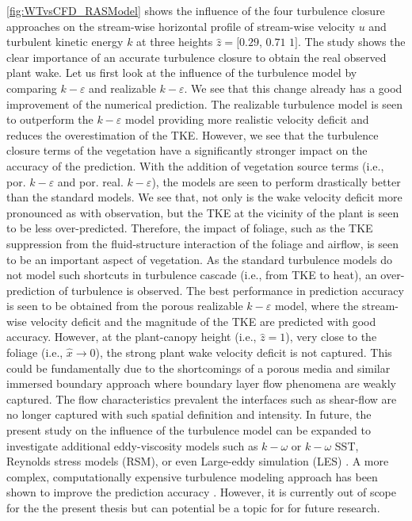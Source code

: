 \cref{fig:WTvsCFD_RASModel} shows the influence of the four turbulence closure approaches on the stream-wise horizontal profile of stream-wise velocity $u$ and turbulent kinetic energy $k$ at three heights $\hat{z} = [0.29$, $0.71$ $1]$. The study shows the clear importance of an accurate turbulence closure to obtain the real observed plant wake. Let us first look at the influence of the turbulence model by comparing $k-\varepsilon$ and realizable $k-\varepsilon$. We see that this change already has a good improvement of the numerical prediction. The realizable turbulence model is seen to outperform the $k-\varepsilon$ model providing more realistic velocity deficit and reduces the overestimation of the TKE. However, we see that the turbulence closure terms of the vegetation have a significantly stronger impact on the accuracy of the prediction. With the addition of vegetation source terms (i.e., por. $k-\varepsilon$ and por. real. $k-\varepsilon$), the models are seen to perform drastically better than the standard models. We see that, not only is the wake velocity deficit more pronounced as with observation, but the TKE at the vicinity of the plant is seen to be less over-predicted. Therefore, the impact of foliage, such as the TKE suppression from the fluid-structure interaction of the foliage and airflow, is seen to be an important aspect of vegetation. As the standard turbulence models do not model such shortcuts in turbulence cascade (i.e., from TKE to heat), an over-prediction of turbulence is observed. The best performance in prediction accuracy is seen to be obtained from the porous realizable $k-\varepsilon$ model, where the stream-wise velocity deficit and the magnitude of the TKE are predicted with good accuracy. However, at the plant-canopy height (i.e., $\hat{z} = 1$), very close to the foliage (i.e., $\hat{x} \rightarrow 0$), the strong plant wake velocity deficit is not captured. This could be fundamentally due to the shortcomings of a porous media and similar immersed boundary approach where boundary layer flow phenomena are weakly captured. The flow characteristics prevalent the interfaces such as shear-flow are no longer captured with such spatial definition and intensity. In future, the present study on the influence of the turbulence model can be expanded to investigate additional eddy-viscosity models such as $k-\omega$ or $k-\omega$ SST, Reynolds stress models (RSM), or even Large-eddy simulation (LES) . A more complex, computationally expensive turbulence modeling approach has been shown to improve the prediction accuracy \citep{Hiraoka2011,Yue2008,Lopes2013}. However, it is currently out of scope for the the present thesis but can potential be a topic for for future research.

